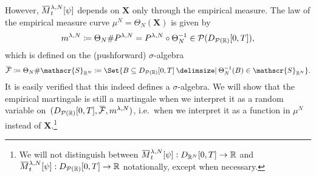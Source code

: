 However, \(\ol{M}_t^{\lambda,N}[\psi]\) depends on \( \bm{X} \) only through the empirical measure.
The law of the empirical measure curve \(\mu^N = \Theta_N(\bm{X})\) is given by
\begin{equation}
  m^{\lambda,N} \coloneqq \Theta_N \# P^{\lambda, N} = P^{\lambda, N} \circ \Theta_N^{-1} \in \mathcal{P}(D_{\mathcal{P}(\mathbb{R})}[0,T]),
\end{equation}
which is defined on the (pushforward) \( \sigma \)-algebra
\begin{equation}
  \ol{\cF} \coloneqq \Theta_N \# \mathscr{S}_{\potspace^N} \coloneqq \Set{B \subseteq D_{\cP(\potspace)}[0,T] \given \Theta_N^{-1}(B) \in \mathscr{S}_{\potspace^N}}.
\end{equation}
It is easily verified that this indeed defines a \( \sigma \)-algebra.
We will show that the empirical martingale is still a martingale when we interpret it as a random variable on~\((D_{\cP(\potspace)}[0,T], \ol{\cF}, \lawmu^{\lambda,N})\), i.e.\ when we interpret it as a function in \(\mu^N\) instead of \(\bm{X}\).\footnote{We will not distinguish between \( \ol{M}_t^{\lambda,N}[\psi] :  D_{\potspace^N}[0,T] \to \bR \) and \( \ol{M}_t^{\lambda,N}[\psi] :  D_{\cP(\potspace)}[0,T] \to \bR \) notationally, except when necessary.}

